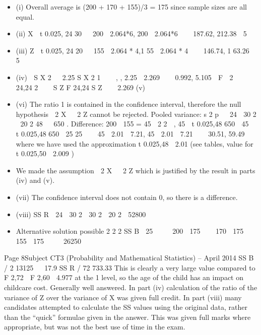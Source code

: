 \documentclass[a4paper,12pt]{article}
\begin{document}
\newpage
\begin{itemize}
\item (i) Overall average is (200 + 170 + 155)/3 = 175 since sample sizes are all equal.
\item (ii) X  t 0.025, 24
30
  200  2.064*6, 200  2.064*6    187.62, 212.38 
5
\item (iii) Z  t 0.025, 24
20
  155  2.064 * 4,1 55  2.064 * 4    146.74, 1 63.26 
5
\item (iv)  S X 2
  2.25
S X 2
1



,
, 2.25  2.269    0.992, 5.105 
F
 2
  
24,24
2

  S Z F 24,24 S Z
   2.269
(v)
\item (vi)
The ratio 1 is contained in the confidence interval, therefore the null
hypothesis  2 X   2 Z cannot be rejected.
Pooled variance:
s 2 p


24  30 2  20 2
48
  650 .
Difference: 200  155 = 45

2
2 
, 45  t 0.025,48 650
 45  t 0.025,48 650

25
25 

 45  2.01  7.21, 45  2.01  7.21    30.51, 59.49 
where we have used the approximation t 0.025,48  2.01 (see tables, value for
t 0.025,50  2.009 )
\item We made the assumption  2 X   2 Z which is justified by the result in parts (iv)
and (v).
\item (vii) The confidence interval does not contain 0, so there is a difference.
\item (viii) SS R  24  30 2  30 2  20 2  52800


\item Alternative solution possible
2
2
2
SS B  25     200  175    170  175    155  175     26250


\end{itemize}
Page 8Subject CT3 (Probability and Mathematical Statistics) – April 2014 
SS B / 2 13125

 17.9
SS R / 72 733.33
This is clearly a very large value compared to F 2,72  F 2,60  4.977 at the 1%
level, so the age of the child has an impact on childcare cost.
Generally well answered. In part (iv) calculation of the ratio of the variance of Z over the
variance of X was given full credit. In part (viii) many candidates attempted to calculate the
SS values using the original data, rather than the “quick” formulae given in the answer. This
was given full marks where appropriate, but was not the best use of time in the exam.
\end{document}

